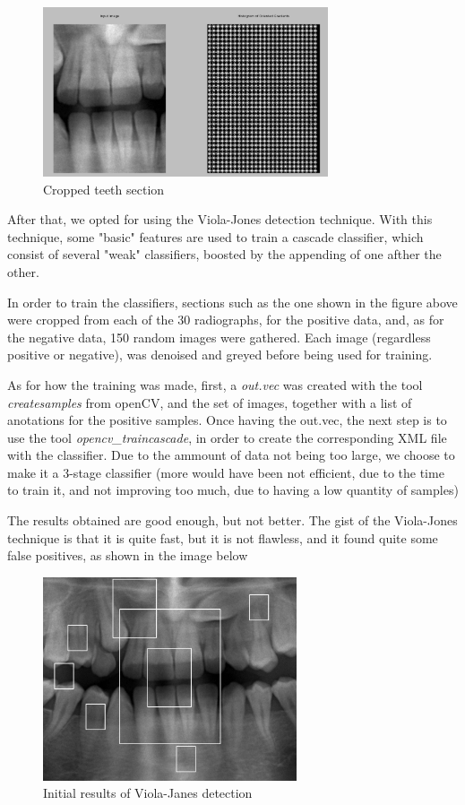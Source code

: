 \begin{figure}[h]
  \centering
  \includegraphics[height=5cm]{img/teeth_hog}
  \caption{Cropped teeth section}
\end{figure}

After that, we opted for using the Viola-Jones detection technique. With this
technique, some "basic" features are used to train a cascade classifier, which
consist of several "weak" classifiers, boosted by the appending of one afther
the other. 

In order to train the classifiers, sections such as the one shown in the figure
above were cropped from each of the 30 radiographs, for the positive data, and,
as for the negative data, 150 random images were gathered. Each image
(regardless positive or negative), was denoised and greyed before being used for
training. 

As for how the training was made, first, a \textit{out.vec} was created with the
tool \textit{createsamples} from openCV, and the set of images, together with a list
of anotations for the positive samples. Once having the out.vec, the next step
is to use the tool \textit{opencv\_traincascade}, in order to create the
corresponding XML file with the classifier. Due to the ammount of data not
being too large, we choose to make it a 3-stage classifier (more would have been
not efficient, due to the time to train it, and not improving too much, due to
having a low quantity of samples)

The results obtained are good enough, but not better. The gist of
the Viola-Jones technique is that it is quite fast, but it is not flawless, and
it found quite some false positives, as shown in the image below

\begin{figure}[h]
  \centering
  \includegraphics[height=6cm]{img/teeth_detection_1}
  \caption{Initial results of Viola-Janes detection}
\end{figure}

